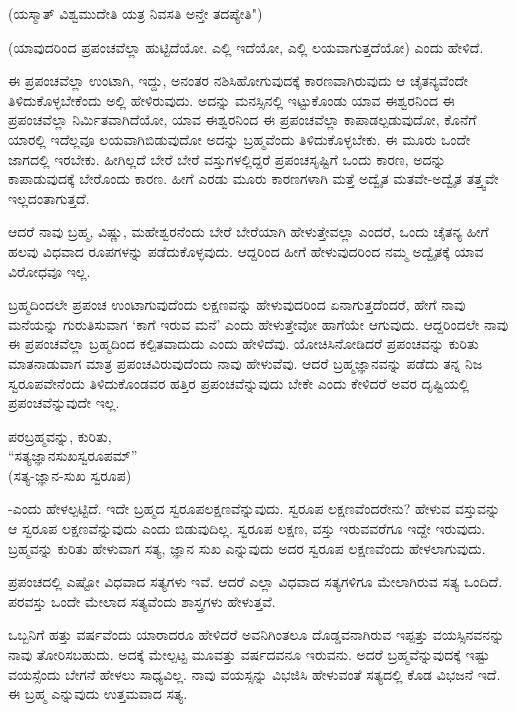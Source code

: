 \begin{shloka}
(ಯಸ್ಮಾತ್ ವಿಶ್ವಮುದೇತಿ ಯತ್ರ ನಿವಸತಿ ಅನ್ತೇ ತದಪ್ಯೇತಿ")
\end{shloka}

(ಯಾವುದರಿಂದ ಪ್ರಪಂಚವೆಲ್ಲಾ ಹುಟ್ಟಿದೆಯೋ. ಎಲ್ಲಿ ಇದೆಯೋ, ಎಲ್ಲಿ ಲಯವಾಗುತ್ತದೆಯೋ) ಎಂದು ಹೇಳಿದೆ.

ಈ ಪ್ರಪಂಚವೆಲ್ಲಾ ಉಂಟಾಗಿ, ಇದ್ದು, ಅನಂತರ ನಶಿಸಿಹೋಗುವುದಕ್ಕೆ  ಕಾರಣವಾಗಿರುವುದು ಆ ಚೈತನ್ಯವೆಂದೇ ತಿಳಿದುಕೊಳ್ಳಬೇಕೆಂದು ಅಲ್ಲಿ ಹೇಳಿರುವುದು. ಅದನ್ನು ಮನಸ್ಸಿನಲ್ಲಿ ಇಟ್ಟುಕೊಂಡು ಯಾವ ಈಶ್ವರನಿಂದ ಈ ಪ್ರಪಂಚವೆಲ್ಲಾ ನಿರ್ಮಿತವಾಗಿದೆಯೋ, ಯಾವ ಈಶ್ವರನಿಂದ ಈ ಪ್ರಪಂಚವೆಲ್ಲಾ ಕಾಪಾಡಲ್ಪಡುವುದೋ, ಕೊನೆಗೆ ಯಾರಲ್ಲಿ ಇದೆಲ್ಲವೂ ಲಯವಾಗಿಬಿಡುವುದೋ ಅದನ್ನು  ಬ್ರಹ್ಮವೆಂದು ತಿಳಿದುಕೊಳ್ಳಬೇಕು. ಈ ಮೂರು ಒಂದೇ ಜಾಗದಲ್ಲಿ ಇರಬೇಕು. ಹೀಗಿಲ್ಲದೆ ಬೇರೆ ಬೇರೆ ವಸ್ತುಗಳಲ್ಲಿದ್ದರೆ ಪ್ರಪಂಚಸೃಷ್ಟಿಗೆ ಒಂದು ಕಾರಣ, ಅದನ್ನು ಕಾಪಾಡುವುದಕ್ಕೆ  ಬೇರೊಂದು ಕಾರಣ. ಹೀಗೆ ಎರಡು ಮೂರು ಕಾರಣಗಳಾಗಿ ಮತ್ತೆ ಅದ್ವೈತ ಮತವೇ-ಅದ್ವೈತ ತತ್ತ್ವವೇ ಇಲ್ಲದಂತಾಗುತ್ತದೆ. 

ಆದರೆ ನಾವು ಬ್ರಹ್ಮ, ವಿಷ್ಣು, ಮಹೇಶ್ವರನೆಂದು ಬೇರೆ ಬೇರೆಯಾಗಿ ಹೇಳುತ್ತೇವಲ್ಲಾ ಎಂದರೆ, ಒಂದು ಚೈತನ್ಯ ಹೀಗೆ ಹಲವು ವಿಧವಾದ ರೂಪಗಳನ್ನು ಪಡೆದುಕೊಳ್ಳವುದು.  ಆದ್ದರಿಂದ ಹೀಗೆ ಹೇಳುವುದರಿಂದ  ನಮ್ಮ ಅದ್ವೈತಕ್ಕೆ ಯಾವ ವಿರೋಧವೂ ಇಲ್ಲ. 

ಬ್ರಹ್ಮದಿಂದಲೇ ಪ್ರಪಂಚ ಉಂಟಾಗುವುದೆಂದು ಲಕ್ಷಣವನ್ನು ಹೇಳುವುದರಿಂದ  ಏನಾಗುತ್ತದೆಂದರೆ, ಹೇಗೆ ನಾವು ಮನೆಯನ್ನು ಗುರುತಿಸುವಾಗ  `ಕಾಗೆ ಇರುವ ಮನೆ' ಎಂದು ಹೇಳುತ್ತೇವೋ ಹಾಗೆಯೇ ಆಗುವುದು. ಆದ್ದರಿಂದಲೇ ನಾವು ಈ ಪ್ರಪಂಚವೆಲ್ಲಾ ಬ್ರಹ್ಮದಿಂದ ಕಲ್ಪಿತವಾದುದು ಎಂದು ಹೇಳಿದೆವು. ಯೋಚಿಸಿನೋಡಿದರೆ ಪ್ರಪಂಚವನ್ನು ಕುರಿತು ಮಾತನಾಡುವಾಗ ಮಾತ್ರ ಪ್ರಪಂಚವಿರುವುದೆಂದು ನಾವು ಹೇಳುವೆವು. ಆದರೆ ಬ್ರಹ್ಮಜ್ಞಾನವನ್ನು ಪಡೆದು ತನ್ನ ನಿಜ ಸ್ವರೂಪವೇನೆಂದು ತಿಳಿದುಕೊಂಡವರ ಹತ್ತಿರ  ಪ್ರಪಂಚವೆನ್ನುವುದು ಬೇಕೇ ಎಂದು ಕೇಳಿದರೆ ಅವರ ದೃಷ್ಟಿಯಲ್ಲಿ ಪ್ರಪಂಚವೆನ್ನುವುದೇ ಇಲ್ಲ.

\begin{shloka}
ಪರಬ್ರಹ್ಮವನ್ನು, ಕುರಿತು, \\
``ಸತ್ಯಜ್ಞಾನಸುಖಸ್ವರೂಪಮ್''\\
(ಸತ್ಯ-ಜ್ಞಾನ-ಸುಖ ಸ್ವರೂಪ)
\end{shloka}

-ಎಂದು ಹೇಳಲ್ಪಟ್ಟಿದೆ. ಇದೇ ಬ್ರಹ್ಮದ ಸ್ವರೂಪಲಕ್ಷಣವೆನ್ನುವುದು. ಸ್ವರೂಪ ಲಕ್ಷಣವೆಂದರೇನು? ಹೇಳುವ ವಸ್ತುವನ್ನು ಆ ಸ್ವರೂಪ ಲಕ್ಷಣವೆನ್ನುವುದು ಎಂದು ಬಿಡುವುದಿಲ್ಲ. ಸ್ವರೂಪ ಲಕ್ಷಣ, ವಸ್ತು ಇರುವವರೆಗೂ ಇದ್ದೇ ಇರುವುದು. ಬ್ರಹ್ಮವನ್ನು ಕುರಿತು ಹೇಳುವಾಗ ಸತ್ಯ, ಜ್ಞಾನ ಸುಖ ಎನ್ನುವುದು ಅದರ ಸ್ವರೂಪ ಲಕ್ಷಣವೆಂದು ಹೇಳಲಾಗುವುದು.

ಪ್ರಪಂಚದಲ್ಲಿ ಎಷ್ಟೋ ವಿಧವಾದ ಸತ್ಯಗಳು ಇವೆ. ಆದರೆ ಎಲ್ಲಾ ವಿಧವಾದ ಸತ್ಯಗಳಿಗೂ ಮೇಲಾಗಿರುವ ಸತ್ಯ ಒಂದಿದೆ. ಪರವಸ್ತು ಒಂದೇ ಮೇಲಾದ ಸತ್ಯವೆಂದು ಶಾಸ್ತ್ರಗಳು ಹೇಳುತ್ತವೆ.

ಒಬ್ಬನಿಗೆ ಹತ್ತು ವರ್ಷವೆಂದು ಯಾರಾದರೂ ಹೇಳಿದರೆ ಅವನಿಗಿಂತಲೂ ದೊಡ್ಡವನಾಗಿರುವ ಇಪ್ಪತ್ತು ವಯಸ್ಸಿನವನನ್ನು ನಾವು ತೋರಿಸಬಹುದು. ಅದಕ್ಕೆ ಮೇಲ್ಪಟ್ಟ ಮೂವತ್ತು ವರ್ಷದವನೂ ಇರುವನು. ಅದರೆ ಬ್ರಹ್ಮವೆನ್ನುವುದಕ್ಕೆ ಇಷ್ಟು  ವಯಸ್ಸೆಂದು ಬೇಗನೆ ಹೇಳಲು ಸಾಧ್ಯವಿಲ್ಲ. ನಾವು ವಯಸ್ಸನ್ನು ವಿಭಜಿಸಿ ಹೇಳುವಂತೆ ಸತ್ಯದಲ್ಲಿ ಕೊಡ ವಿಭಜನೆ ಇದೆ. ಈ ಬ್ರಹ್ಮ ಎನ್ನುವುದು ಉತ್ತಮವಾದ ಸತ್ಯ. 

